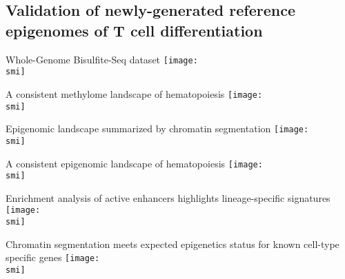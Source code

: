 \documentclass[10pt]{beamer}
\def\smi{out/ln/updir/mw-gcthesis-oral/library.bib}
\begin{document}
    \subsection{Validation of newly-generated reference epigenomes of T cell differentiation}
    \begin{frame}{Whole-Genome Bisulfite-Seq dataset}
      \def\smi{out/ln/updir/mw-gcthesis-oral/ink/wgbs/matrix.pdf}
      \texttt{[image: \\smi]}%
    \end{frame}
    \begin{frame}{A consistent methylome landscape of hematopoiesis}
      \def\smi{out/ln/updir/mw-gcthesis-oral/ink/wgbs/matrix-tsne.pdf}
      \texttt{[image: \\smi]}%
    \end{frame}
    \begin{frame}{Epigenomic landscape summarized by chromatin segmentation}
      \def\smi{out/ln/updir/mw-gcthesis-oral/ink/chromatin-states/matrix-model.pdf}
      \texttt{[image: \\smi]}%
    \end{frame}
    \begin{frame}{A consistent epigenomic landscape of hematopoiesis}
      \def\smi{out/ln/updir/mw-gcthesis-oral/ink/chromatin-states/matrix-mca.pdf}
      \texttt{[image: \\smi]}
    \end{frame}
    \begin{frame}{Enrichment analysis of active enhancers highlights lineage-specific signatures}
      \def\smi{out/ln/updir/mw-gcthesis-oral/ink/chromatin-states/msigdb-model.pdf}
      \texttt{[image: \\smi]}
    \end{frame}
    \begin{frame}{Chromatin segmentation meets expected epigenetics status for known cell-type specific genes} 
      \def\smi{out/ln/updir/mw-gcthesis-oral/ink/chromatin-states/genome-view/hematopoiesis/hsc-marker.pdf}
      \texttt{[image: \\smi]}
    \end{frame}
\end{document}
